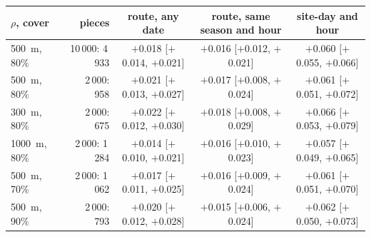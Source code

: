 \begin{tabular}{@{}l r c c c@{}}
\toprule
$\rho$, cover & pieces & route, any date & route, same season and hour & site-day and hour \\
\midrule
500~m, 80\% & 10\,000: 4\,933 & $+$0.018 [$+$0.014, $+$0.021] & $+$0.016 [$+$0.012, $+$0.021] & $+$0.060 [$+$0.055, $+$0.066] \\
500~m, 80\% & 2\,000: 958 & $+$0.021 [$+$0.013, $+$0.027] & $+$0.017 [$+$0.008, $+$0.024] & $+$0.061 [$+$0.051, $+$0.072] \\
300~m, 80\% & 2\,000: 675 & $+$0.022 [$+$0.012, $+$0.030] & $+$0.018 [$+$0.008, $+$0.029] & $+$0.066 [$+$0.053, $+$0.079] \\
1000~m, 80\% & 2\,000: 1\,284 & $+$0.014 [$+$0.010, $+$0.021] & $+$0.016 [$+$0.010, $+$0.023] & $+$0.057 [$+$0.049, $+$0.065] \\
500~m, 70\% & 2\,000: 1\,062 & $+$0.017 [$+$0.011, $+$0.025] & $+$0.016 [$+$0.009, $+$0.024] & $+$0.061 [$+$0.051, $+$0.070] \\
500~m, 90\% & 2\,000: 793 & $+$0.020 [$+$0.012, $+$0.028] & $+$0.015 [$+$0.006, $+$0.024] & $+$0.062 [$+$0.050, $+$0.073] \\
\bottomrule
\end{tabular}
